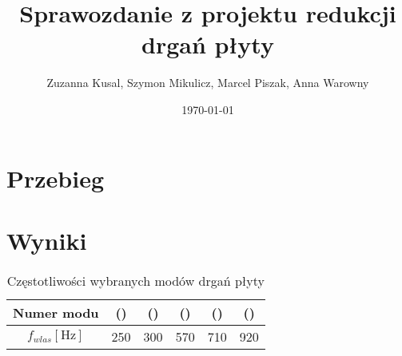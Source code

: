 \documentclass[polish,a4paper,11pt]{mwart}
\date{\today}
\author{Zuzanna Kusal, Szymon Mikulicz, Marcel Piszak, Anna Warowny}
\title{Sprawozdanie z projektu redukcji drgań płyty}
\let\Oldsection\section
\renewcommand{\section}{\FloatBarrier\Oldsection}
\begin{document}
\maketitle

\section{Przebieg}
\section{Wyniki}

\begin{table}[!tbh]
  \centering
  \caption{Częstotliwości wybranych modów drgań płyty}
  \begin{tabular}{|c|c|c|c|c|c|}
    \hline
    Numer modu & () & () & () & () & () \\
    \hline
    $f_{wlas} [\si{\hertz}]$ & 250 & 300 & 570 & 710 & 920\\
    \hline
  \end{tabular}
  \label{tab:czest}
\end{table}
\end{document}
